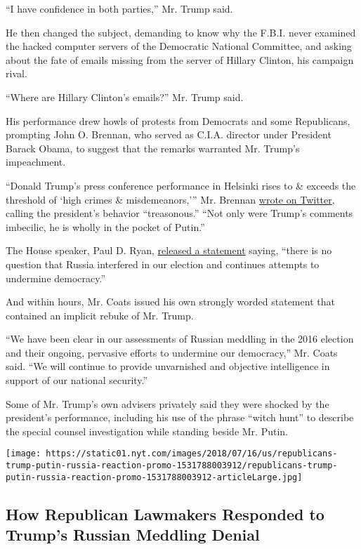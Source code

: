 ``I have confidence in both parties,'' Mr. Trump said.

He then changed the subject, demanding to know why the F.B.I. never
examined the hacked computer servers of the Democratic National
Committee, and asking about the fate of emails missing from the server
of Hillary Clinton, his campaign rival.

``Where are Hillary Clinton's emails?'' Mr. Trump said.

His performance drew howls of protests from Democrats and some
Republicans, prompting John O. Brennan, who served as C.I.A. director
under President Barack Obama, to suggest that the remarks warranted Mr.
Trump's impeachment.

``Donald Trump's press conference performance in Helsinki rises to \&
exceeds the threshold of `high crimes \& misdemeanors,''' Mr. Brennan
\href{https://twitter.com/JohnBrennan/status/1018885971104985093}{wrote
on Twitter}, calling the president's behavior ``treasonous.'' ``Not only
were Trump's comments imbecilic, he is wholly in the pocket of Putin.''

The House speaker, Paul D. Ryan,
\href{https://www.speaker.gov/press-release/statement-russia}{released a
statement} saying, ``there is no question that Russia interfered in our
election and continues attempts to undermine democracy.''

And within hours, Mr. Coats issued his own strongly worded statement
that contained an implicit rebuke of Mr. Trump.

``We have been clear in our assessments of Russian meddling in the 2016
election and their ongoing, pervasive efforts to undermine our
democracy,'' Mr. Coats said. ``We will continue to provide unvarnished
and objective intelligence in support of our national security.''

Some of Mr. Trump's own advisers privately said they were shocked by the
president's performance, including his use of the phrase ``witch hunt''
to describe the special counsel investigation while standing beside Mr.
Putin.

\href{https://www.nytimes.com/interactive/2018/07/16/us/politics/republicans-trump-putin-russia-reaction.html}{}

\texttt{[image: https://static01.nyt.com/images/2018/07/16/us/republicans-trump-putin-russia-reaction-promo-1531788003912/republicans-trump-putin-russia-reaction-promo-1531788003912-articleLarge.jpg]}

\hypertarget{how-republican-lawmakers-responded-to-trumps-russian-meddling-denial}{%
\subsection{How Republican Lawmakers Responded to Trump's Russian
Meddling
Denial}\label{how-republican-lawmakers-responded-to-trumps-russian-meddling-denial}}

